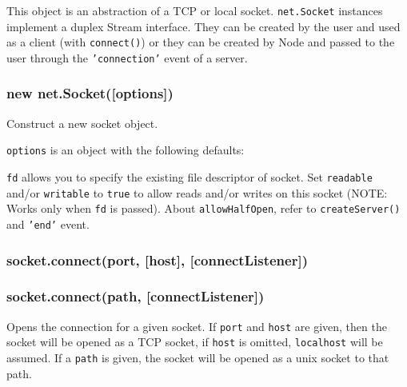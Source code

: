 This object is an abstraction of a TCP or local socket.
\texttt{net.Socket} instances implement a duplex Stream interface. They
can be created by the user and used as a client (with
\texttt{connect()}) or they can be created by Node and passed to the
user through the \texttt{'connection'} event of a server.

\subsubsection{new
net.Socket({[}options{]})}\label{new-net.socketoptions}

Construct a new socket object.

\texttt{options} is an object with the following defaults:

\begin{Shaded}
\begin{Highlighting}[]
\NormalTok{\{ }\NormalTok{: }
  \NormalTok{: }\NormalTok{,}
  \NormalTok{: }\NormalTok{,}
  \NormalTok{: }
\NormalTok{\}}
\end{Highlighting}
\end{Shaded}

\texttt{fd} allows you to specify the existing file descriptor of
socket. Set \texttt{readable} and/or \texttt{writable} to \texttt{true}
to allow reads and/or writes on this socket (NOTE: Works only when
\texttt{fd} is passed). About \texttt{allowHalfOpen}, refer to
\texttt{createServer()} and \texttt{'end'} event.

\subsubsection{socket.connect(port, {[}host{]},
{[}connectListener{]})}\label{socket.connectport-host-connectlistener}

\subsubsection{socket.connect(path,
{[}connectListener{]})}\label{socket.connectpath-connectlistener}

Opens the connection for a given socket. If \texttt{port} and
\texttt{host} are given, then the socket will be opened as a TCP socket,
if \texttt{host} is omitted, \texttt{localhost} will be assumed. If a
\texttt{path} is given, the socket will be opened as a unix socket to
that path.

